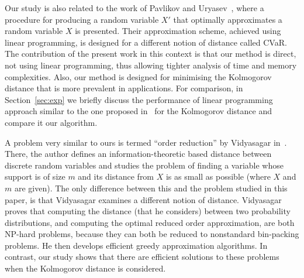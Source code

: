 \documentclass[letterpaper]{article} %
\begin{document}

Our study is also related to the work of Pavlikov and Uryasev~, where a procedure for producing a random variable $X'$ that optimally approximates a random variable $X$ is presented. Their approximation scheme, achieved using linear programming, is designed for a different notion of distance called CVaR. The contribution of the present work in this context is that our method is direct, not using linear programming, thus allowing tighter analysis of time and memory complexities. Also, our method is designed for minimising the Kolmogorov distance that is more prevalent in applications. For comparison, in Section~\ref{sec:exp} we briefly discuss the performance of linear programming approach similar to the one proposed in~\cite{pavlikov2016cvar} for the Kolmogorov distance and compare it our algorithm. 

A problem very similar to ours is termed ``order reduction'' by Vidyasagar in~\cite{vidyasagar2012metric}. There, the author defines an information-theoretic based distance between discrete random variables and studies the problem of finding a variable whose support is of size $m$ and its distance from $X$ is as small as possible (where $X$ and $m$ are given). The only difference between this and the problem studied in this paper, is that Vidyasagar examines a different notion of distance. Vidyasagar proves that computing the distance (that he considers) between two probability distributions, and computing the optimal reduced order approximation, are both NP-hard problems, because they can both be reduced to nonstandard bin-packing problems. He then develops efficient greedy approximation algorithms. In contrast, our study shows that there are efficient solutions to these problems when the Kolmogorov distance is considered. 
\end{document}
